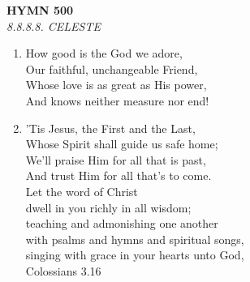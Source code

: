 \documentclass[11pt,a4paper]{article}
\begin{document}
\newpage
\begin{center}
    {\Large \textbf{HYMN 500}}
    \\
    \textit{8.8.8.8. CELESTE}
\end{center}
\vspace{1em}

\begin{enumerate}
    \item How good is the God we adore, \\
        Our faithful, unchangeable Friend, \\
        Whose love is as great as His power, \\
        And knows neither measure nor end!

    \item 'Tis Jesus, the First and the Last, \\
        Whose Spirit shall guide us safe home; \\
        We'll praise Him for all that is past, \\
        And trust Him for all that's to come. \\
        Let the word of Christ \\
        dwell in you richly in all wisdom; \\
        teaching and admonishing one another \\
        with psalms and hymns and spiritual songs, \\
        singing with grace in your hearts unto God, \\
        Colossians 3.16

\end{enumerate}
\end{document}
